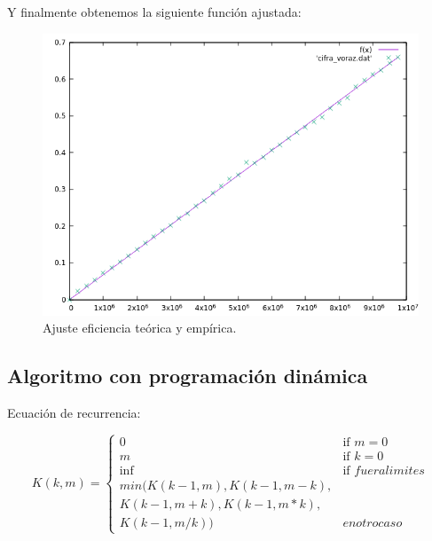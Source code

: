 Y finalmente obtenemos la siguiente función ajustada:
\begin{figure}[H]
    \begin{center}
        \includegraphics[scale=0.7]{imagenes/cifra_voraz_adj.png}
        \caption{Ajuste eficiencia teórica y empírica.}
        \label{fig3}
    \end{center}
\end{figure}


\subsection{Algoritmo con programación dinámica}


Ecuación de recurrencia:

\begin{equation}
    K(k,m) =
\left\{
	\begin{array}{ll}
		0 & \mbox{if } m = 0 \\
		m & \mbox{if } k = 0 \\
		\inf & \mbox{if } fuera limites\\
	    min( K(k-1,m), K(k-1,m-k), \\K(k-1,m+k), K(k-1,m*k),\\ K(k-1,m/k)) & en otro caso
	\end{array}
\right.
\end{equation}



